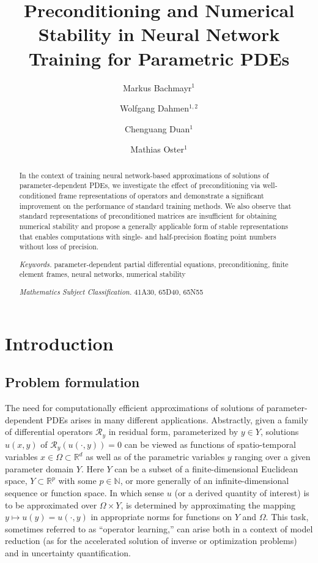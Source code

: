 \documentclass[a4paper,11pt]{amsart}
\title[Numerical Stability in Neural Network Training]{Preconditioning and Numerical Stability in Neural Network Training for Parametric PDEs}
\author{}
\author{Markus Bachmayr$^1$}
\author{Wolfgang Dahmen$^{1,2}$}
\author{Chenguang Duan$^{1}$}
\author{Mathias Oster$^{1}$}
\numberwithin{equation}{section}
\theoremstyle{definition}
\theoremstyle{remark}
\theoremstyle{plain}
\newcommand{\R}{\mathbb{R}}
\newcommand{\N}{\mathbb{N}}
\begin{document}
\maketitle

\vspace{-18pt}
\begin{abstract}
In the context of training  neural network-based approximations of solutions of parameter-dependent PDEs, we investigate the effect of preconditioning via well-conditioned frame representations of operators and demonstrate a significant improvement on the performance of standard training methods. We also observe that standard representations of preconditioned matrices are insufficient for obtaining numerical stability and propose a generally applicable form of stable representations that enables computations with single- and half-precision floating point numbers without loss of precision.

 \bigskip
\noindent \emph{Keywords.} parameter-dependent partial differential equations, preconditioning, finite element frames, neural networks, numerical stability

\smallskip
\noindent \emph{Mathematics Subject Classification.} 41A30, 65D40, 65N55
\end{abstract}

\section{Introduction}

\subsection{Problem formulation}
The need for computationally efficient approximations of solutions of parameter-dependent PDEs arises in many different applications. Abstractly, given a family of differential operators $\mathcal R_y$ in residual form,   parameterized by $y\in Y$,  
solutions $u(x,y)$  of $\mathcal R_y(u(\cdot, y) ) = 0$ can be viewed as functions of spatio-temporal variables $x\in \Omega \subset \R^d$ as well as of the parametric variables $y$
ranging over a given parameter domain $Y$. Here $Y$ can be a subset of a finite-dimensional  Euclidean space, $Y \subset \R^p$ with some $p\in\N$, or more generally of an infinite-dimensional sequence or function space.
In which sense   $u$ (or a derived quantity of interest) is to be approximated over $\Omega\times Y$, is determined by
   approximating the mapping $y \mapsto  u(y) = u(\cdot, y)$ in  appropriate norms
   for functions  on $Y$ and $\Omega$.  This task, sometimes referred to as ``operator learning,''   can arise both in a context of model reduction (as for the accelerated solution of inverse or optimization problems) and in uncertainty quantification.
\end{document}
